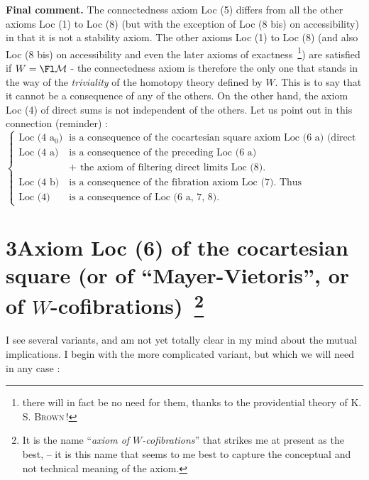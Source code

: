 \textbf{Final comment.} The connectedness axiom Loc (5) differs from all the other axioms Loc (1) to Loc (8) (but with the exception of Loc (8 bis) on accessibility) in that it is not a stability axiom. The other axioms Loc (1) to Loc (8) (and also Loc (8 bis) on accessibility and even the later axioms %
of exactness~\footnote[7]{there will in fact be no need for them, thanks to the providential theory of K. S. \textsc{Brown}\,!}) are satisfied if $W=\Fl\mathcal{M}$ - the connectedness axiom is therefore the only one that stands in the way of the \textit{triviality} of the homotopy theory defined by $W$. This is to say that it cannot be a consequence of any of the others. On the other hand, the axiom Loc (4) of direct sums is not independent of the others. Let us point out in this connection (reminder) :
\[
\left\{
\begin{array}{rl}
\text{Loc (4 a$_0$)} & \text{is a consequence of the cocartesian square axiom Loc (6 a) (direct form).}\\[1ex]
\text{Loc (4 a)} & \text{is a consequence of the preceding Loc (6 a)}\\
 & \text{+ the axiom of filtering direct limits Loc (8).}\\[3ex]
\text{Loc (4 b)} & \text{is a consequence of the fibration axiom Loc (7). Thus}\\[1ex]
\text{Loc (4)} & \text{is a consequence of Loc (6 a, 7, 8).}
\end{array}
\right.
\]


\section*{3\quad Axiom Loc (6) of the cocartesian square (or of ``Mayer-Vietoris'', or of $W$-cofibrations)~\footnote[8]{It is the name ``\textit{axiom of $W$-cofibrations}'' that strikes me at present as the best, -- it is this name that seems to me best to capture the conceptual and not technical meaning of the axiom.}}

I see several variants, and am not yet totally clear in my mind about the mutual implications. I begin with the more complicated variant, but which we will need in any case :

